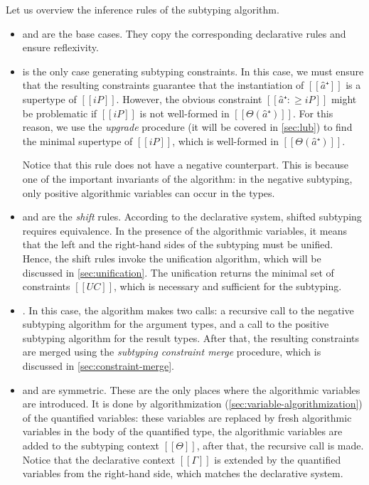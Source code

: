 \documentclass[acmsmall,natbib=false,review,anonymous]{acmart}
\begin{document}
Let us overview the inference rules of the subtyping algorithm.
\begin{itemize}
  \item {} and  
    are the base cases. They copy the corresponding declarative rules and
    ensure reflexivity.
  \item {} is the only case generating 
    subtyping constraints. In this case, we must ensure
    that the resulting constraints guarantee that the instantiation of 
    $[[â⁺]]$ is a supertype of $[[iP]]$.
    However, the obvious constraint $[[â⁺ :≥ iP]]$ might be problematic
    if  $[[iP]]$ is not well-formed in $[[Θ(â⁺)]]$. For this reason,
    we use the \emph{upgrade} procedure (it will be covered in \cref{sec:lub})
    to find the minimal supertype of $[[iP]]$, which is well-formed in $[[Θ(â⁺)]]$. 

    Notice that this rule does not have a negative counterpart. This is
    because one of the important invariants of the algorithm: 
    in the negative subtyping, only positive algorithmic variables
    can occur in the types. 
    
  \item {} and  are the
    \emph{shift} rules. According to the declarative system,
    shifted subtyping requires equivalence. In the presence of the algorithmic 
    variables, it means that the left and the right-hand sides of the subtyping
    must be unified. Hence, the shift rules invoke the unification algorithm, 
    which will be discussed in \cref{sec:unification}. The unification 
    returns the minimal set of constraints $[[UC]]$, which is necessary
    and sufficient for the subtyping. 

  \item {}.
    In this case, the algorithm makes two calls:
    a recursive call to the negative subtyping algorithm for the argument types,
    and a call to the positive subtyping algorithm for the result types.
    After that, the resulting constraints are merged using the
    \emph{subtyping constraint merge} procedure, 
    which is discussed in \cref{sec:constraint-merge}.
  \item {} and 
    are symmetric. These are the only places where 
    the algorithmic variables are introduced.
    It is done by algorithmization (\cref{sec:variable-algorithmization}) 
    of the quantified variables: these variables are replaced by 
    fresh algorithmic variables in the body of the quantified type,
    the algorithmic variables are added to the subtyping context $[[Θ]]$,
    after that, the recursive call is made. Notice that the declarative context
    $[[Γ]]$ is extended by the quantified variables from the right-hand side,
    which matches the declarative system.
\end{itemize}
\end{document}
